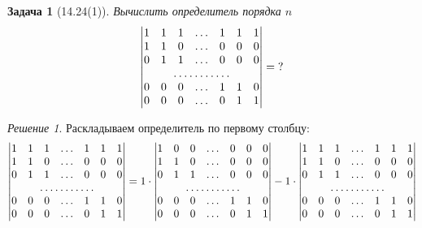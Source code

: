 \documentclass[a4paper,12pt]{article}
\newtheorem*{problem}{Задача}
\theoremstyle{definition}
\theoremstyle{remark}
\theoremstyle{remark}
\theoremstyle{remark}
\newtheorem*{solution}{Решение}
\begin{document}
  \begin{problem}[14.24(1)]
    Вычислить определитель порядка $n$
    \[
      \begin{vmatrix}
        1 & 1 & 1 & \ldots & 1 & 1 & 1\\
        1 & 1 & 0 & \ldots & 0 & 0 & 0\\
        0 & 1 & 1 & \ldots & 0 & 0 & 0\\
        \hdotsfor{7}\\
        0 & 0 & 0 & \ldots & 1 & 1 & 0\\
        0 & 0 & 0 & \ldots & 0 & 1 & 1
      \end{vmatrix} = \?
    \]
  \end{problem}
  
  \begin{solution}
    Раскладываем определитель по первому столбцу:
    \[
      \begin{vmatrix}
        1 & 1 & 1 & \ldots & 1 & 1 & 1\\
        1 & 1 & 0 & \ldots & 0 & 0 & 0\\
        0 & 1 & 1 & \ldots & 0 & 0 & 0\\
        \hdotsfor{7}\\
        0 & 0 & 0 & \ldots & 1 & 1 & 0\\
        0 & 0 & 0 & \ldots & 0 & 1 & 1
      \end{vmatrix}
      = 1 \cdot \begin{vmatrix}
          1 & 0 & 0 & \ldots & 0 & 0 & 0\\
          1 & 1 & 0 & \ldots & 0 & 0 & 0\\
          0 & 1 & 1 & \ldots & 0 & 0 & 0\\
          \hdotsfor{7}\\
          0 & 0 & 0 & \ldots & 1 & 1 & 0\\
          0 & 0 & 0 & \ldots & 0 & 1 & 1
        \end{vmatrix}
        - 1 \cdot \begin{vmatrix}
          1 & 1 & 1 & \ldots & 1 & 1 & 1\\
          1 & 1 & 0 & \ldots & 0 & 0 & 0\\
          0 & 1 & 1 & \ldots & 0 & 0 & 0\\
          \hdotsfor{7}\\
          0 & 0 & 0 & \ldots & 1 & 1 & 0\\
          0 & 0 & 0 & \ldots & 0 & 1 & 1
        \end{vmatrix}
    \]
    

\end{solution}
\end{document}
